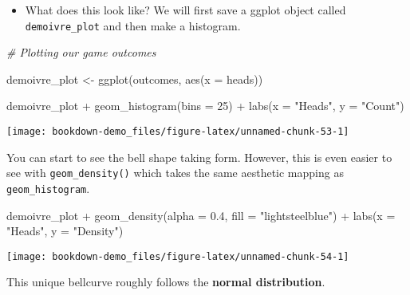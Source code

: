 \documentclass[
]{book}
\newenvironment{Shaded}{\begin{snugshade}}{\end{snugshade}}
\newcommand{\AttributeTok}[1]{\textcolor[rgb]{0.77,0.63,0.00}{#1}}
\newcommand{\CommentTok}[1]{\textcolor[rgb]{0.56,0.35,0.01}{\textit{#1}}}
\newcommand{\DecValTok}[1]{\textcolor[rgb]{0.00,0.00,0.81}{#1}}
\newcommand{\FloatTok}[1]{\textcolor[rgb]{0.00,0.00,0.81}{#1}}
\newcommand{\FunctionTok}[1]{\textcolor[rgb]{0.00,0.00,0.00}{#1}}
\newcommand{\NormalTok}[1]{#1}
\newcommand{\OtherTok}[1]{\textcolor[rgb]{0.56,0.35,0.01}{#1}}
\newcommand{\SpecialCharTok}[1]{\textcolor[rgb]{0.00,0.00,0.00}{#1}}
\newcommand{\StringTok}[1]{\textcolor[rgb]{0.31,0.60,0.02}{#1}}
\providecommand{\tightlist}{%
  \setlength{\itemsep}{0pt}\setlength{\parskip}{0pt}}
\begin{document}
\begin{itemize}
\tightlist
\item
  What does this look like? We will first save a ggplot object called \texttt{demoivre\_plot} and then make a histogram.
\end{itemize}

\begin{Shaded}
\begin{Highlighting}[]
\CommentTok{\# Plotting our game outcomes}

\NormalTok{demoivre\_plot }\OtherTok{\textless{}{-}} \FunctionTok{ggplot}\NormalTok{(outcomes, }\FunctionTok{aes}\NormalTok{(}\AttributeTok{x =}\NormalTok{ heads))}
  
\NormalTok{demoivre\_plot }\SpecialCharTok{+}
  \FunctionTok{geom\_histogram}\NormalTok{(}\AttributeTok{bins =} \DecValTok{25}\NormalTok{) }\SpecialCharTok{+}
  \FunctionTok{labs}\NormalTok{(}\AttributeTok{x =} \StringTok{"Heads"}\NormalTok{, }\AttributeTok{y =} \StringTok{"Count"}\NormalTok{)}
\end{Highlighting}
\end{Shaded}

\begin{center}\texttt{[image: bookdown-demo\_files/figure-latex/unnamed-chunk-53-1]} \end{center}

You can start to see the bell shape taking form. However, this is even easier to see with \texttt{geom\_density()} which takes the same aesthetic mapping as \texttt{geom\_histogram}.

\begin{Shaded}
\begin{Highlighting}[]
\NormalTok{demoivre\_plot }\SpecialCharTok{+}
  \FunctionTok{geom\_density}\NormalTok{(}\AttributeTok{alpha =} \FloatTok{0.4}\NormalTok{, }\AttributeTok{fill =} \StringTok{"lightsteelblue"}\NormalTok{) }\SpecialCharTok{+}
  \FunctionTok{labs}\NormalTok{(}\AttributeTok{x =} \StringTok{"Heads"}\NormalTok{, }\AttributeTok{y =} \StringTok{"Density"}\NormalTok{)}
\end{Highlighting}
\end{Shaded}

\begin{center}\texttt{[image: bookdown-demo\_files/figure-latex/unnamed-chunk-54-1]} \end{center}

This unique bellcurve roughly follows the \textbf{normal distribution}.
\end{document}
